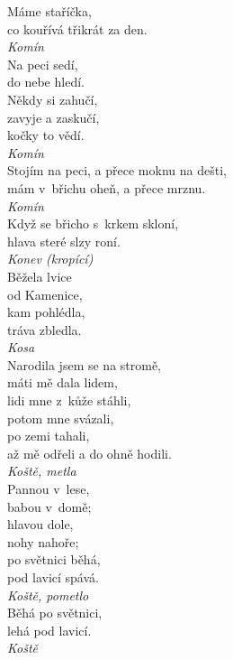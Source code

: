 \begin{multicols}{4}
\noindent
Máme staříčka,\\
co kouřívá třikrát za den.\\[1 mm]
{\sl Komín}\\

\noindent
Na peci sedí,\\
do nebe hledí.\\
Někdy si zahučí,\\
zavyje a zaskučí,\\
kočky to vědí.\\[1 mm]
{\sl Komín}\\

\noindent
Stojím na peci, a přece moknu na dešti,\\
mám v~břichu oheň, a přece mrznu.\\[1 mm]
{\sl Komín}\\

\noindent
Když se břicho s~krkem skloní,\\
hlava steré slzy roní.\\[1 mm]
{\sl Konev (kropící)}\\

\noindent
Běžela lvice\\
od Kamenice,\\
kam pohlédla,\\
tráva zbledla.\\[1 mm]
{\sl Kosa}\\

\noindent
Narodila jsem se na stromě,\\
máti mě dala lidem,\\
lidi mne z~kůže stáhli,\\
potom mne svázali,\\
po zemi tahali,\\
až mě odřeli a do ohně hodili.\\[1 mm]
{\sl Koště, metla}\\

\noindent
Pannou v~lese,\\
babou v~domě;\\
hlavou dole,\\
nohy nahoře;\\
po světnici běhá,\\
pod lavicí spává.\\[1 mm]
{\sl Koště, pometlo}\\

\noindent
Běhá po světnici,\\
lehá pod lavicí.\\[1 mm]
{\sl Koště}\\


\end{multicols}
